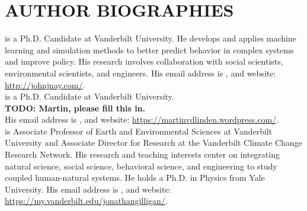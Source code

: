 \documentclass{wscpaperproc}\usepackage[]{graphicx}\usepackage[]{color}
\begin{document}


\section*{AUTHOR BIOGRAPHIES}

 is a Ph.D. Candidate at Vanderbilt University. He develops and applies machine learning and simulation methods to better predict behavior in complex systems and improve policy. His research involves collaboration with social scientists, environmental scientists, and engineers. His email address is , and website: \href{http://johnjnay.com/}{http://johnjnay.com/}.\\

 is a Ph.D. Candidate at Vanderbilt University. \\
\textbf{TODO: Martin, please fill this in.}\\
His email address is , and website: \href{https://martinvdlinden.wordpress.com/}{https://martinvdlinden.wordpress.com/}.\\

 is Associate Professor of Earth and Environmental Sciences at Vanderbilt University and Associate Director for Research at the Vanderbilt Climate Change Research Network. His research and teaching interests center on integrating natural science, social science, behavioral science, and engineering to study coupled human-natural systems. He holds a  Ph.D. in Physics from Yale University. His email address is , and website: \href{https://my.vanderbilt.edu/jonathangilligan/}{https://my.vanderbilt.edu/jonathangilligan/}.
\end{document}
